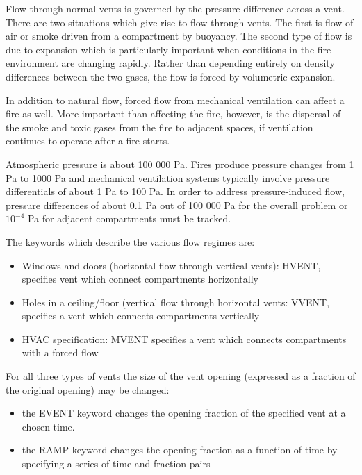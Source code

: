 Flow through normal vents is governed by the pressure difference across a vent.  There are two situations which give rise to flow through vents.  The first is flow of air or smoke driven from a compartment by buoyancy.  The second type of flow is due to expansion which is particularly important when conditions in the fire environment are changing rapidly.  Rather than depending entirely on density differences between the two gases, the flow is forced by volumetric expansion.

In addition to natural flow, forced flow from mechanical ventilation can affect a fire as well. More important than affecting the fire, however, is the dispersal of the smoke and toxic gases from the fire to adjacent spaces, if ventilation continues to operate after a fire starts.

Atmospheric pressure is about 100 000 Pa. Fires produce pressure changes from 1 Pa to 1000 Pa and mechanical ventilation systems typically involve pressure differentials of about 1 Pa to 100 Pa.  In order to address pressure-induced flow, pressure differences of about 0.1 Pa out of 100 000 Pa for the overall problem or $10^{-4}$ Pa for adjacent compartments must be tracked.

The keywords which describe the various flow regimes are:

\begin{itemize}
\item Windows and doors (horizontal flow through vertical vents): HVENT, specifies vent which connect compartments horizontally
\item Holes in a ceiling/floor (vertical flow through horizontal vents: VVENT, specifies a vent which connects compartments vertically
\item HVAC specification: MVENT specifies a vent which connects compartments with a forced flow
\end{itemize}

For all three types of vents the size of the vent opening (expressed as a fraction of the original opening) may be changed:

\begin{itemize}
\item the EVENT keyword changes the opening fraction of the specified vent at a chosen time.
\item the RAMP keyword changes the opening fraction as a function of time by specifying a series of time and fraction pairs
\end{itemize}

